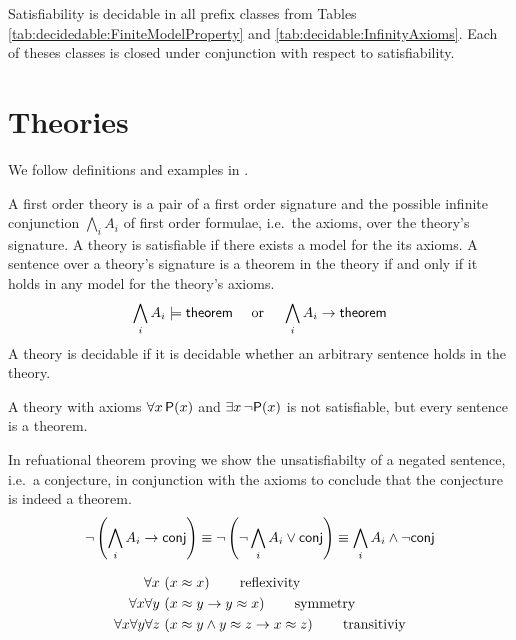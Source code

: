 \begin{lemma}
	Satisfiability is decidable \cite{MR1482227} in all prefix classes from Tables 
	\ref{tab:decidedable:FiniteModelProperty} and \ref{tab:decidable:InfinityAxioms}.
	Each of theses classes is closed under conjunction with respect to satisfiability.
\end{lemma}



\section{Theories}\label{sec:decidable:fol:theories}

We follow definitions and examples in \cite{AM2015L}.

\begin{definition}[Theory]
	A {\myem first order theory} is a pair of a first order signature 
	and the possible infinite conjunction $\bigwedge_i A_i$ of first order formulae, 
	i.e.~the axioms, over the theory's signature. 
	A theory is satisfiable if there exists a model for the its axioms.
%	
	A sentence over a theory's signature is a {\myem theorem} in the theory 
	if and only if it holds in any model for the theory's axioms.
	\[
		\bigwedge_i A_i \models \mathsf{theorem} 
		\quad\text{ or }\quad
		\bigwedge_i A_i \rightarrow \mathsf{theorem} 
	\]
	A theory is decidable if it is decidable whether an arbitrary sentence holds in the theory.
\end{definition}

\begin{example}
A theory with axioms $\forall x\,{\mathsf P}(x)$ and $\exists x\,\lnot{\mathsf P}(x)$ is not satisfiable,
but every sentence is a theorem.
\end{example}
%
\begin{remark} 
In refuational theorem proving
we show the unsatisfiabilty 
of a negated sentence, 
i.e.~a {\myem conjecture},
in conjunction with the axioms
to conclude that the conjecture is indeed a theorem.
\[
	\lnot\left(\bigwedge_i A_i \rightarrow \mathsf{conj}\right) \equiv
	\lnot\left(\lnot\bigwedge_i A_i \lor \mathsf{conj}\right) \equiv
	\bigwedge_i A_i \land \lnot \mathsf{conj}
\]
\end{remark}

\begin{definition}
	[Equivalence]
	\label{def:equivalence:axioms}
\begin{align*}
\forall x\, 
&\left(x \approx x\right) 
\tag*{reflexivity}
\\
\forall x \forall y\, 
&\left(x \approx y \rightarrow y \approx x \right)
\tag*{symmetry} 
\\
\forall x \forall y \forall z\,
&\left(x \approx y \land y\approx z \rightarrow x\approx z\right) 
\tag*{transitiviy}
\end{align*}
\end{definition}

